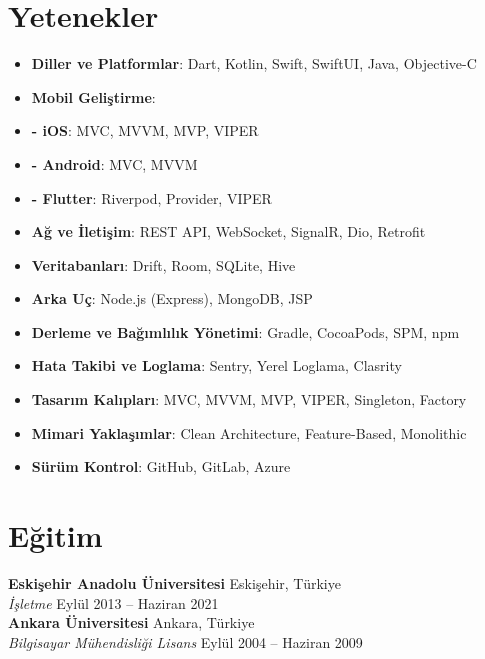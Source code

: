 \documentclass[11pt,a4paper]{extarticle}
\begin{document}
\section{Yetenekler}
\begin{itemize}[leftmargin=*,noitemsep,topsep=0pt]
    \item \textbf{Diller ve Platformlar}: Dart, Kotlin, Swift, SwiftUI, Java, Objective-C
    \item \textbf{Mobil Geliştirme}: 
    \item \textbf{- iOS}: MVC, MVVM, MVP, VIPER
    \item \textbf{- Android}: MVC, MVVM
    \item \textbf{- Flutter}: Riverpod, Provider, VIPER
    \item \textbf{Ağ ve İletişim}: REST API, WebSocket, SignalR, Dio, Retrofit
    \item \textbf{Veritabanları}: Drift, Room, SQLite, Hive
    \item \textbf{Arka Uç}: Node.js (Express), MongoDB, JSP
    \item \textbf{Derleme ve Bağımlılık Yönetimi}: Gradle, CocoaPods, SPM, npm
    \item \textbf{Hata Takibi ve Loglama}: Sentry, Yerel Loglama, Clasrity
    \item \textbf{Tasarım Kalıpları}: MVC, MVVM, MVP, VIPER, Singleton, Factory
    \item \textbf{Mimari Yaklaşımlar}: Clean Architecture, Feature-Based, Monolithic
    \item \textbf{Sürüm Kontrol}: GitHub, GitLab, Azure
\end{itemize}

\section{Eğitim}
\textbf{Eskişehir Anadolu Üniversitesi} \hfill Eskişehir, Türkiye\\
\textit{İşletme} \hfill Eylül 2013 -- Haziran 2021\\
\textbf{Ankara Üniversitesi} \hfill Ankara, Türkiye\\
\textit{Bilgisayar Mühendisliği Lisans} \hfill Eylül 2004 -- Haziran 2009\\
\end{document}
